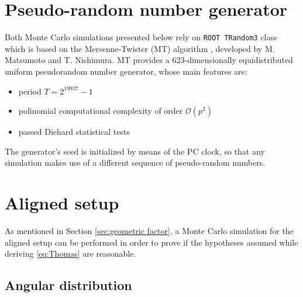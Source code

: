 \section{Pseudo-random number generator}

Both Monte Carlo simulations presented below rely on \texttt{ROOT TRandom3} class \cite{TRandom3} which is based on the Mersenne-Twister (MT) algorithm \cite{MT}, developed by M. Matsumoto and T. Nishimura. MT provides a 623-dimensionally equidistributed uniform pseudorandom number generator, whose main features are:
\begin{itemize}
	\item period $T=2^{19937}-1$
	\item polinomial computational complexity of order $\mathcal{O}\left(p^2\right)$
	\item passed Diehard statistical tests
\end{itemize}

The generator's seed is initialized by means of the PC clock, so that any simulation makes use of a different sequence of pseudo-random numbers.

\section{Aligned setup}
\label{sec:aligned}

As mentioned in Section \ref{sec:geometric factor}, a Monte Carlo simulation for the aligned setup can be performed in order to prove if the hypotheses assumed while deriving \eqref{eq:Thomas} are reasonable.

\subsection{Angular distribution}
\label{sec:angdistrib}

